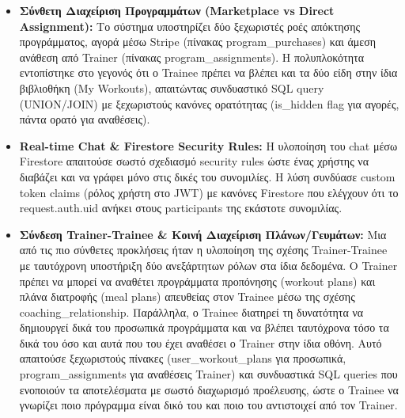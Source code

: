 \documentclass[12pt,a4paper]{report}
\begin{document}
\begin{itemize}
    \item \textbf{Σύνθετη Διαχείριση Προγραμμάτων (Marketplace vs Direct Assignment):} Το σύστημα υποστηρίζει δύο ξεχωριστές ροές απόκτησης προγράμματος, αγορά μέσω \textenglish{Stripe} (πίνακας \textenglish{program\_purchases}) και άμεση ανάθεση από \textenglish{Trainer} (πίνακας \textenglish{program\_assignments}). Η πολυπλοκότητα εντοπίστηκε στο γεγονός ότι ο \textenglish{Trainee} πρέπει να βλέπει και τα δύο είδη στην ίδια βιβλιοθήκη (\textenglish{My Workouts}), απαιτώντας συνδυαστικό \textenglish{SQL query (UNION/JOIN)} με ξεχωριστούς κανόνες ορατότητας (\textenglish{is\_hidden flag} για αγορές, πάντα ορατό για αναθέσεις).

    \item \textbf{Real-time Chat \& Firestore Security Rules:} Η υλοποίηση του \textenglish{chat} μέσω \textenglish{Firestore} απαιτούσε σωστό σχεδιασμό \textenglish{security rules} ώστε ένας χρήστης να διαβάζει και να γράφει μόνο στις δικές του συνομιλίες. Η λύση συνδύασε \textenglish{custom token claims} (ρόλος χρήστη στο \textenglish{JWT}) με κανόνες \textenglish{Firestore} που ελέγχουν ότι το \textenglish{request.auth.uid} ανήκει στους \textenglish{participants} της εκάστοτε συνομιλίας.

    \item \textbf{Σύνδεση Trainer-Trainee \& Κοινή Διαχείριση Πλάνων/Γευμάτων:} Μια από τις πιο σύνθετες προκλήσεις ήταν η υλοποίηση της σχέσης \textenglish{Trainer-Trainee} με ταυτόχρονη υποστήριξη δύο ανεξάρτητων ρόλων στα ίδια δεδομένα. Ο \textenglish{Trainer} πρέπει να μπορεί να αναθέτει προγράμματα προπόνησης (\textenglish{workout plans}) και πλάνα διατροφής (\textenglish{meal plans}) απευθείας στον \textenglish{Trainee} μέσω της σχέσης \textenglish{coaching\_relationship}. Παράλληλα, ο \textenglish{Trainee} διατηρεί τη δυνατότητα να δημιουργεί δικά του προσωπικά προγράμματα και να βλέπει ταυτόχρονα τόσο τα δικά του όσο και αυτά που του έχει αναθέσει ο \textenglish{Trainer} στην ίδια οθόνη. Αυτό απαιτούσε ξεχωριστούς πίνακες (\textenglish{user\_workout\_plans} για προσωπικά, \textenglish{program\_assignments} για αναθέσεις \textenglish{Trainer}) και συνδυαστικά \textenglish{SQL queries} που ενοποιούν τα αποτελέσματα με σωστό διαχωρισμό προέλευσης, ώστε ο \textenglish{Trainee} να γνωρίζει ποιο πρόγραμμα είναι δικό του και ποιο του αντιστοιχεί από τον \textenglish{Trainer}.


\end{itemize}
\end{document}
